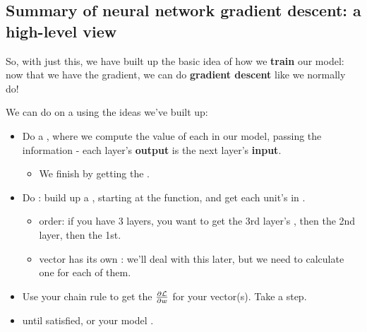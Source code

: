     \secdiv
    
    \subsection{Summary of neural network gradient descent: a high-level view}
    
        So, with just this, we have built up the basic idea of how we \textbf{train} our model: now that we have the gradient, we can do \textbf{gradient descent} like we normally do!
            \\
        
        \begin{concept}
            We can do  on a  using the ideas we've built up:
            
            \boxdiv
            
            \begin{itemize}
                \item Do a , where we compute the value of each  in our model, passing the information  - each layer's \textbf{output} is the next layer's \textbf{input}.
                    \begin{itemize}
                        \item We finish by getting the .
                    \end{itemize}
                    
            \boxdiv
                    
                \item Do : build up a , starting at the  function, and get each unit's  in .
                    \begin{itemize}
                        \item {} order: if you have 3 layers, you want to get the 3rd layer's , then the 2nd layer, then the 1st.
                        
                        \item {} vector has its own : we'll deal with this later, but we need to calculate one for each of them.
                    \end{itemize}
                    
            \boxdiv
                
                \item Use your chain rule to get the  $\frac{\partial \mathcal{L}}{\partial w}$ for your  vector(s). Take a  step.
                
                \item {} until satisfied, or your model .
            \end{itemize}
        \end{concept}
        
